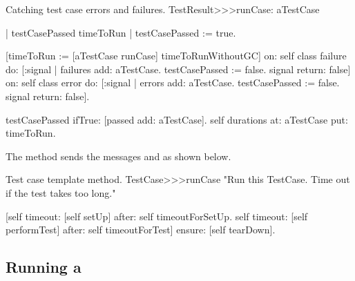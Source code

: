 \documentclass[a4paper,10pt,twoside]{book}
\begin{document}
\begin{method}[testresultruncase]{Catching test case errors and failures.}
TestResult>>>runCase: aTestCase

	| testCasePassed timeToRun |
	testCasePassed := true.

	[timeToRun := [aTestCase runCase] timeToRunWithoutGC]
		on: self class failure
		do: [:signal |
				failures add: aTestCase.
				testCasePassed := false.
				signal return: false]
		on: self class error
		do: [:signal |
				errors add: aTestCase.
				testCasePassed := false.
				signal return: false].

	testCasePassed ifTrue: [passed add: aTestCase].
	self durations at: aTestCase put: timeToRun.
\end{method}

The method  sends the messages  and  as shown below.
\begin{method}[testcaseruncase]{Test case template method.}
TestCase>>>runCase
	"Run this TestCase. Time out if the test takes too long."

	[self timeout: [self setUp] after: self timeoutForSetUp.
	self timeout: [self performTest] after: self timeoutForTest]
			ensure: [self tearDown].
\end{method}

\subsection{Running a }
\end{document}
